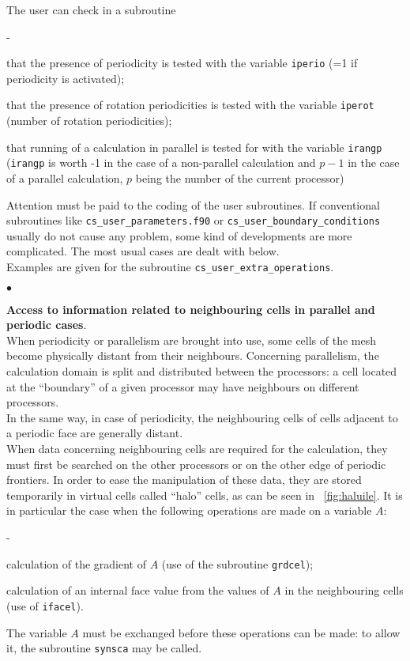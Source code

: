 {{{The user can check in a subroutine
\begin{list}{-}{}
\item that the presence of periodicity is tested with the variable
      \texttt{iperio} (=1 if periodicity is activated);
\item that the presence of rotation periodicities is tested with the variable
      \texttt{iperot} (number of rotation periodicities);
\item that running of a calculation in parallel is tested for with the
      variable \texttt{irangp} (\texttt{irangp} is worth -1 in the case of a
      non-parallel calculation and $p-1$ in the case of a parallel calculation,
      $p$ being the number of the current processor)
\end{list}
Attention must be paid to the coding of the user subroutines. If
conventional subroutines like \texttt{cs\_user\_parameters.f90} or \texttt{cs\_user\_boundary\_conditions}
usually do not cause any problem, some kind of developments are more
complicated. The most usual cases are dealt with below. \\ Examples are
given for the subroutine \texttt{cs\_user\_extra\_operations}.
\begin{list}{$\bullet$}{}
\item {\bf Access to information related to neighbouring cells in
      parallel and periodic cases}.\\
When periodicity or parallelism are brought into use, some cells of the
      mesh become physically distant from their neighbours. Concerning
      parallelism, the calculation domain is split and distributed
      between the processors: a cell located at the ``boundary'' of a
      given processor may have neighbours on different processors. \\
In the same way, in case of periodicity, the neighbouring cells of cells
      adjacent to a periodic face are generally distant. \\
When data concerning neighbouring cells are required for the
      calculation, they must first be searched on the other processors
      or on the other edge of periodic frontiers. In order to ease the
      manipulation of these data, they are stored temporarily in virtual
      cells called ``halo'' cells, as can be seen in \figurename~\ref{fig:haluile}.
It is in particular the case when the following operations are made on a
      variable $A$:
\begin{list}{-}{}
\item calculation of the gradient of $A$ (use of the subroutine \texttt{grdcel});
\item calculation of an internal face value from the values of $A$  in
      the neighbouring cells (use of \texttt{ifacel}).
\end{list}
The variable $A$ must be exchanged before these operations can be
      made: to allow it, the subroutine \texttt{synsca} may be called.


\end{list}}}}

